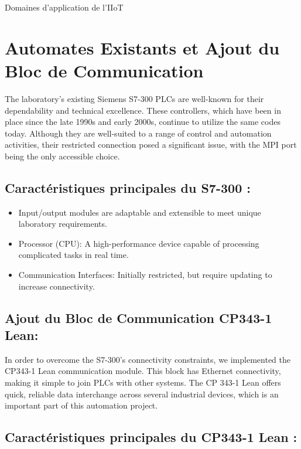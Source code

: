
 Domaines d’application de l’IIoT







\section{Automates Existants et Ajout du Bloc de Communication}
The laboratory's existing Siemens S7-300 PLCs are well-known for their dependability and technical excellence. These controllers, which have been in place since the late 1990s and early 2000s, continue to utilize the same codes today. Although they are well-suited to a range of control and automation activities, their restricted connection posed a significant issue, with the MPI port being the only accessible choice.




\subsection{Caractéristiques principales du S7-300 :}
\begin{itemize}
    \item Input/output modules are adaptable and extensible to meet unique laboratory requirements.
    \item Processor (CPU): A high-performance device capable of processing complicated tasks in real time.
    \item Communication Interfaces: Initially restricted, but require updating to increase connectivity.
\end{itemize}
\subsection{Ajout du Bloc de Communication CP343-1 Lean:}
In order to overcome the S7-300's connectivity constraints, we implemented the CP343-1 Lean communication module. This block has Ethernet connectivity, making it simple to join PLCs with other systems.
The CP 343-1 Lean offers quick, reliable data interchange across several industrial devices, which is an important part of this automation project.

\subsection{Caractéristiques principales du CP343-1 Lean :}

